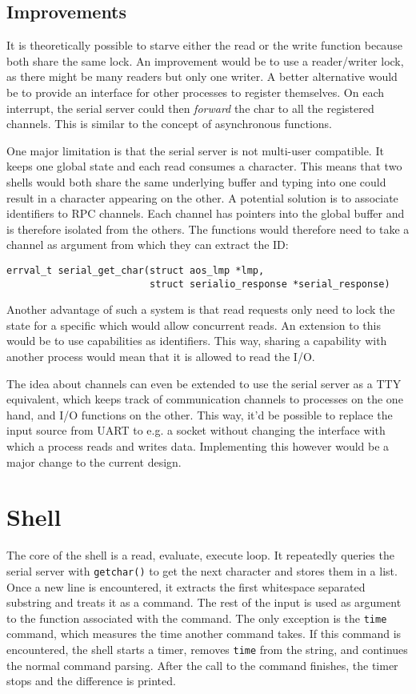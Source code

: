 \subsection{Improvements}
It is theoretically possible to starve either the read or the write function because both share the same lock. An improvement would be to use a reader/writer lock, as there might be many readers but only one writer. A better alternative would be to provide an interface for other processes to register themselves. On each interrupt, the serial server could then \emph{forward} the char to all the registered channels. This is similar to the concept of asynchronous functions.

One major limitation is that the serial server is not multi-user compatible. It keeps one global state and each read consumes a character. This means that two shells would both share the same underlying buffer and typing into one could result in a character appearing on the other. A potential solution is to associate identifiers to RPC channels. Each channel has pointers into the global buffer and is therefore isolated from the others. The functions would therefore need to take a channel as argument from which they can extract the ID: 
\begin{verbatim}
errval_t serial_get_char(struct aos_lmp *lmp, 
                         struct serialio_response *serial_response)
\end{verbatim}
Another advantage of such a system is that read requests only need to lock the state for a specific which would allow concurrent reads. An extension to this would be to use capabilities as identifiers. This way, sharing a capability with another process would mean that it is allowed to read the I/O.
 
The idea about channels can even be extended to use the serial server as a TTY equivalent, which keeps track of communication channels to processes on the one hand, and I/O functions on the other. This way, it'd be possible to replace the input source from UART to e.g. a socket without changing the interface with which a process reads and writes data. Implementing this however would be a major change to the current design.


\section{Shell}
The core of the shell is a read, evaluate, execute loop. It repeatedly queries the serial server with \verb|getchar()| to get the next character and stores them in a list. Once a new line is encountered, it extracts the first whitespace separated substring and treats it as a command. The rest of the input is used as argument to the function associated with the command. The only exception is the \verb|time| command, which measures the time another command takes. If this command is encountered, the shell starts a timer, removes \verb|time| from the string, and continues the normal command parsing. After the call to the command finishes, the timer stops and the difference is printed.

